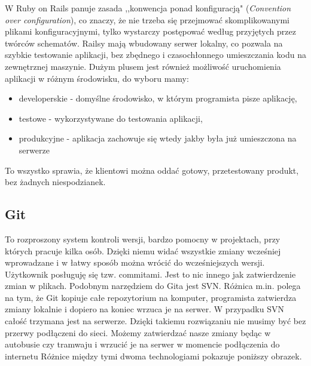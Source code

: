   W Ruby on Rails panuje zasada ,,konwencja ponad konfiguracją" (\emph{Convention over configuration}), co znaczy, że nie trzeba się przejmować skomplikowanymi plikami konfiguracyjnymi, tylko wystarczy postępować według przyjętych przez twórców schematów. Railsy mają wbudowany serwer lokalny, co pozwala na szybkie testowanie aplikacji, bez zbędnego i czasochłonnego umieszczania kodu na zewnętrznej maszynie. Dużym plusem jest również możliwość uruchomienia aplikacji w różnym środowisku, do wyboru mamy:
  \begin{itemize}
    \item developerskie - domyślne środowisko, w którym programista pisze aplikację,
    \item testowe - wykorzystywane do testowania aplikacji,
    \item produkcyjne - aplikacja zachowuje się wtedy jakby była już umieszczona na serwerze
  \end{itemize}
  To wszystko sprawia, że klientowi można oddać gotowy, przetestowany produkt, bez żadnych niespodzianek.

  \subsection{Git}
  To rozproszony system kontroli wersji, bardzo pomocny w projektach, przy których pracuje kilka osób. Dzięki niemu widać wszystkie zmiany wcześniej wprowadzane i w łatwy sposób można wrócić do wcześniejszych wersji. Użytkownik posługuję się tzw. commitami. Jest to nic innego jak zatwierdzenie zmian w plikach. Podobnym narzędziem do Gita jest SVN. Różnica m.in. polega na tym, że Git kopiuje całe repozytorium na komputer, programista zatwierdza zmiany lokalnie i dopiero na koniec wrzuca je na serwer. W przypadku SVN całość trzymana jest na serwerze.
  Dzięki takiemu rozwiązaniu nie musimy być bez przerwy podłączeni do sieci. Możemy zatwierdzać nasze zmiany będąc w autobusie czy tramwaju i wrzucić je na serwer w momencie podłączenia do internetu
  Różnice między tymi dwoma technologiami pokazuje poniższy obrazek.

